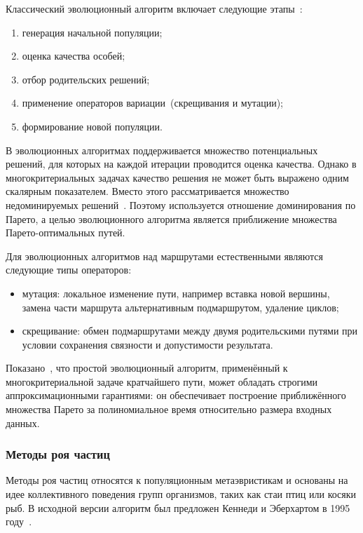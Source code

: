Классический эволюционный алгоритм включает следующие этапы~\cite{PangilinanJanssens2007}:
\begin{enumerate}
\item генерация начальной популяции;
\item оценка качества особей;
\item отбор родительских решений;
\item применение операторов вариации~(скрещивания и мутации);
\item формирование новой популяции.
\end{enumerate}

В эволюционных алгоритмах поддерживается множество потенциальных решений, для которых на каждой итерации проводится оценка качества. Однако в многокритериальных задачах качество решения не может быть выражено одним скалярным показателем. Вместо этого рассматривается множество недоминируемых решений~\cite{PangilinanJanssens2007}. Поэтому используется отношение доминирования по Парето, а целью эволюционного алгоритма является приближение множества Парето-оптимальных путей.

Для эволюционных алгоритмов над маршрутами естественными являются следующие типы операторов:
\begin{itemize}
\item мутация: локальное изменение пути, например вставка новой вершины, замена части маршрута альтернативным подмаршрутом, удаление циклов;
\item скрещивание: обмен подмаршрутами между двумя родительскими путями при условии сохранения связности и допустимости результата.
\end{itemize}

Показано~\cite{Horoba2009}, что простой эволюционный алгоритм, применённый к многокритериальной задаче кратчайшего пути, может обладать строгими аппроксимационными гарантиями: он обеспечивает построение приближённого множества Парето за полиномиальное время относительно размера входных данных.

\subsubsection{Методы роя частиц}

Методы роя частиц относятся к популяционным метаэвристикам и основаны на идее коллективного поведения групп организмов, таких как стаи птиц или косяки рыб. В исходной версии алгоритм был предложен Кеннеди и Эберхартом в 1995 году~\cite{vereshchaga2023design}.

